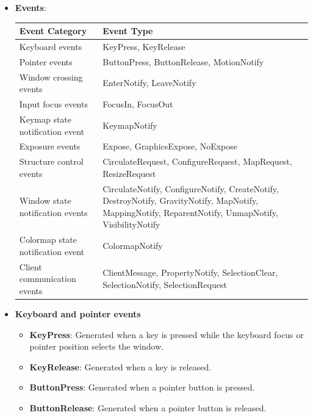 \documentclass{report}
\begin{document}
    \begin{itemize}
        \item \textbf{Events}: 
            \begin{center}
                \begin{tabularx}{\textwidth}{@{}XX@{}}
                    \toprule
                    \textbf{Event Category}& \textbf{Event Type} \\
                    \midrule
                    Keyboard events &KeyPress, KeyRelease\\[2ex]
                    Pointer events &ButtonPress, ButtonRelease, MotionNotify\\[2ex]
                    Window crossing events &EnterNotify, LeaveNotify\\[2ex]
                    Input focus events &FocusIn, FocusOut\\[2ex]
                    Keymap state notification event &KeymapNotify\\[2ex]
                    Exposure events &Expose, GraphicsExpose, NoExpose\\[2ex]
                    Structure control events &CirculateRequest, ConfigureRequest, MapRequest, ResizeRequest \\[2ex]
                    Window state notification events &CirculateNotify, ConfigureNotify, CreateNotify, DestroyNotify, GravityNotify, MapNotify, MappingNotify, ReparentNotify, UnmapNotify, VisibilityNotify\\[2ex]
                    Colormap state notification event& ColormapNotify\\[2ex]
                    Client communication events &ClientMessage, PropertyNotify, SelectionClear, SelectionNotify, SelectionRequest  \\
                    \bottomrule
                \end{tabularx}
            \end{center}
        \item \textbf{Keyboard and pointer events}
            \begin{itemize}
                \item \textbf{KeyPress}: Generated when a key is pressed while the keyboard focus or pointer position selects the window.
                \item \textbf{KeyRelease}: Generated when a key is released.
                \item \textbf{ButtonPress}: Generated when a pointer button is pressed.
                \item \textbf{ButtonRelease}: Generated when a pointer button is released.

\end{itemize}
\end{itemize}
\end{document}
